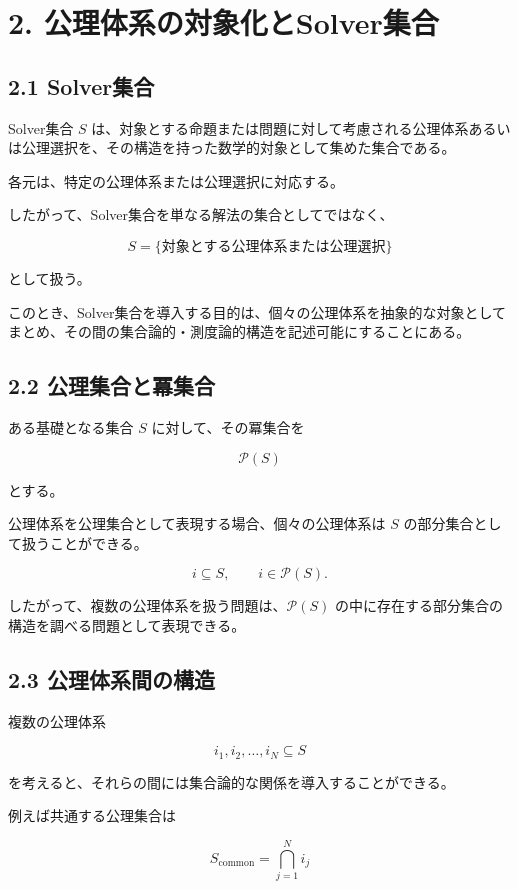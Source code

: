\documentclass[12pt,a4paper]{article}
\begin{document}
\section{2. 公理体系の対象化とSolver集合}

\subsection{2.1 Solver集合}

Solver集合 $S$ は、対象とする命題または問題に対して考慮される公理体系あるいは公理選択を、その構造を持った数学的対象として集めた集合である。

各元は、特定の公理体系または公理選択に対応する。

したがって、Solver集合を単なる解法の集合としてではなく、

\[
S=\{\text{対象とする公理体系または公理選択}\}
\]

として扱う。

このとき、Solver集合を導入する目的は、個々の公理体系を抽象的な対象としてまとめ、その間の集合論的・測度論的構造を記述可能にすることにある。

\subsection{2.2 公理集合と冪集合}

ある基礎となる集合 $S$ に対して、その冪集合を

\[
\mathcal{P}(S)
\]

とする。

公理体系を公理集合として表現する場合、個々の公理体系は $S$ の部分集合として扱うことができる。

\[
i\subseteq S, \qquad i\in\mathcal{P}(S).
\]

したがって、複数の公理体系を扱う問題は、$\mathcal{P}(S)$ の中に存在する部分集合の構造を調べる問題として表現できる。

\subsection{2.3 公理体系間の構造}

複数の公理体系

\[
i_1,i_2,\ldots,i_N\subseteq S
\]

を考えると、それらの間には集合論的な関係を導入することができる。

例えば共通する公理集合は

\[
S_{\mathrm{common}}
=
\bigcap_{j=1}^{N}i_j
\]
\end{document}
